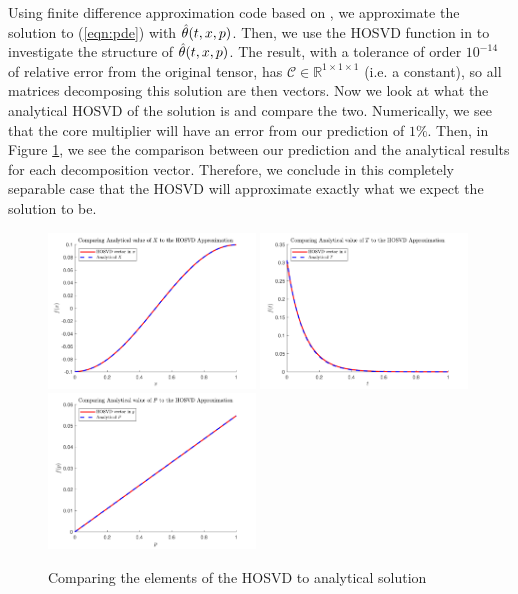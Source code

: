 \documentclass[12pt]{article}
\newcommand{\R}{\mathbb{R}}
\begin{document}
    Using finite difference approximation code based on \cite{pod_book,fin_diff}, we approximate the solution to (\ref{eqn:pde}) with $\Hat{\theta}(t,x,p)$. Then, we use the HOSVD function in \cite{ttb} to investigate the structure of $\Hat{\theta}(t,x,p)$. The result, with a tolerance of order $10^{-14}$ of relative error from the original tensor, has $\mathscr{C}\in\R^{1\times 1\times 1}$ (i.e. a constant), so all matrices decomposing this solution are then vectors. Now we look at what the analytical HOSVD of the solution is and compare the two. Numerically, we see that the core multiplier will have an error from our prediction of $1\%$. Then, in Figure \ref{fig:comp_heat}, we see the comparison between our prediction and the analytical results for each decomposition vector. Therefore, we conclude in this completely separable case that the HOSVD will approximate exactly what we expect the solution to be.
    \begin{figure}[t]
        \centering
        \includegraphics[width=0.49\textwidth]{figures/heat_eqn_comp_x.pdf}
        \includegraphics[width=0.49\textwidth]{figures/heat_eqn_comp_t.pdf}
        \includegraphics[width=0.49\textwidth]{figures/heat_eqn_comp_p.pdf}
        \caption{Comparing the elements of the HOSVD to analytical solution}
        \label{fig:comp_heat}
    \end{figure}
\end{document}
